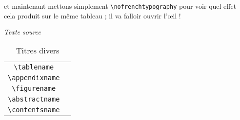 \documentclass[a4paper,12pt,openright]{article}
\begin{document}
et maintenant mettons simplement \verb'\nofrenchtypography' 
pour voir quel effet
cela produit sur le même tableau ; il va falloir ouvrir l’œil !
\begin{center} %
\begin{minipage}{\textwidth}
\begin{center}
\textit{Texte source}\\
\begin{boxedverbatim}
{\nofrenchtypography
 \begin{table}
 \caption{Titres divers}\medskip
  \begin{tabular}{|c|c|}
   \hline
    \verb|\tablename|    & \tablename \\
    \verb|\appendixname| & \appendixname \\
    \verb|\figurename|   & \figurename \\
    \verb|\abstractname| & \abstractname \\
    \verb|\contentsname| & \contentsname \\
    \hline
  \end{tabular}
 \end{table}
}
\end{boxedverbatim}
\\[.5em]
\end{center}
\end{minipage}%
\setcounter{mpfootnote}{1} %
\renewcommand{\thempfootnote}{\arabic{mpfootnote}}


\end{center}
\end{document}
